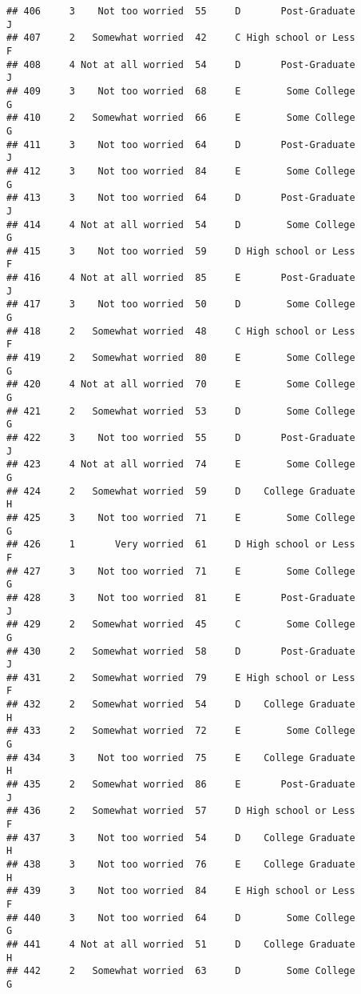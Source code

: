 \documentclass[
]{article}
\begin{document}
\begin{verbatim}
## 406     3    Not too worried  55     D       Post-Graduate         J
## 407     2   Somewhat worried  42     C High school or Less         F
## 408     4 Not at all worried  54     D       Post-Graduate         J
## 409     3    Not too worried  68     E        Some College         G
## 410     2   Somewhat worried  66     E        Some College         G
## 411     3    Not too worried  64     D       Post-Graduate         J
## 412     3    Not too worried  84     E        Some College         G
## 413     3    Not too worried  64     D       Post-Graduate         J
## 414     4 Not at all worried  54     D        Some College         G
## 415     3    Not too worried  59     D High school or Less         F
## 416     4 Not at all worried  85     E       Post-Graduate         J
## 417     3    Not too worried  50     D        Some College         G
## 418     2   Somewhat worried  48     C High school or Less         F
## 419     2   Somewhat worried  80     E        Some College         G
## 420     4 Not at all worried  70     E        Some College         G
## 421     2   Somewhat worried  53     D        Some College         G
## 422     3    Not too worried  55     D       Post-Graduate         J
## 423     4 Not at all worried  74     E        Some College         G
## 424     2   Somewhat worried  59     D    College Graduate         H
## 425     3    Not too worried  71     E        Some College         G
## 426     1       Very worried  61     D High school or Less         F
## 427     3    Not too worried  71     E        Some College         G
## 428     3    Not too worried  81     E       Post-Graduate         J
## 429     2   Somewhat worried  45     C        Some College         G
## 430     2   Somewhat worried  58     D       Post-Graduate         J
## 431     2   Somewhat worried  79     E High school or Less         F
## 432     2   Somewhat worried  54     D    College Graduate         H
## 433     2   Somewhat worried  72     E        Some College         G
## 434     3    Not too worried  75     E    College Graduate         H
## 435     2   Somewhat worried  86     E       Post-Graduate         J
## 436     2   Somewhat worried  57     D High school or Less         F
## 437     3    Not too worried  54     D    College Graduate         H
## 438     3    Not too worried  76     E    College Graduate         H
## 439     3    Not too worried  84     E High school or Less         F
## 440     3    Not too worried  64     D        Some College         G
## 441     4 Not at all worried  51     D    College Graduate         H
## 442     2   Somewhat worried  63     D        Some College         G

\end{verbatim}
\end{document}
